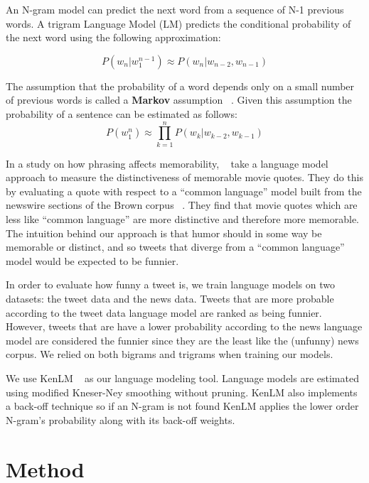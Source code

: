\documentclass[11pt,a4paper]{article}
\begin{document}
An N-gram model can predict the next word from a sequence of N-1 previous words.
A trigram Language Model (LM) predicts the conditional probability of the next word using the following approximation:

\begin{equation}
P(w_n|w_1^{n-1})\approx P(w_n|w_{n-2}, w_{n-1})
\end{equation}

The assumption that the probability of a word depends only on a small number of previous words 
is called a \textbf{Markov} assumption ~\cite{markov1954theory}. Given this assumption 
the probability of a sentence can be estimated as follows:
\begin{equation}
P(w_1^n)\approx \prod_{k=1}^{n} P(w_k|w_{k-2}, w_{k-1})
\end{equation}
 
In a study on how phrasing affects memorability, ~\cite{hello} take a language model approach to measure the distinctiveness of
memorable movie quotes. They do this by evaluating a quote with respect to a ``common language'' model built from the newswire sections 
of the Brown corpus ~\cite{BC}. They find that movie quotes which are less like  ``common language'' are more distinctive and therefore
more memorable. The intuition behind our approach is that humor should in some way be memorable or distinct, and so tweets that 
diverge from a ``common language'' model would be expected to be funnier. 

In order to evaluate how funny a tweet is, we train language models on two datasets: 
the tweet data and the news data. 
Tweets that are more probable according to the tweet data language model 
are ranked as being funnier. However, tweets
that are have a lower probability according to the news language 
model are considered the funnier since they are the least like the 
(unfunny) news corpus. We relied on both
bigrams and trigrams when training our models. 

We use KenLM ~\cite{Heafield-estimate} as our language modeling tool. Language models are estimated using modified Kneser-Ney smoothing 
without pruning. KenLM also implements a back-off technique so if an N-gram is not found KenLM applies the lower order N-gram's probability 
along with its back-off weights. 

\section{Method}
\end{document}
